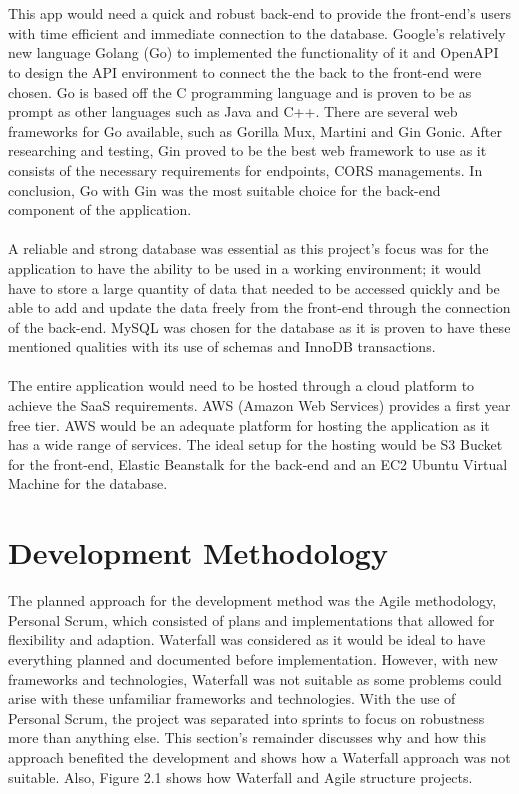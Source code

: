 \\\\ This app would need a quick and robust back-end to provide the front-end's users with time efficient and immediate connection to the database. Google's relatively new language Golang (Go) to implemented the functionality of it and OpenAPI to design the API environment to connect the the back to the front-end were chosen. Go is based off the C programming language and is proven to be as prompt as other languages such as Java and C++. There are several web frameworks for Go available, such as Gorilla Mux, Martini and Gin Gonic. After researching and testing, Gin proved to be the best web framework to use as it consists of the necessary requirements for endpoints, CORS managements. In conclusion, Go with Gin was the most suitable choice for the back-end component of the application.
\\\\ A reliable and strong database was essential as this project's focus was for the application to have the ability to be used in a working environment; it would have to store a large quantity of data that needed to be accessed quickly and be able to add and update the data freely from the front-end through the connection of the back-end. MySQL was chosen for the database as it is proven to have these mentioned qualities with its use of schemas and InnoDB transactions. 
\\\\ The entire application would need to be hosted through a cloud platform to achieve the SaaS requirements. AWS (Amazon Web Services) provides a first year free tier. AWS would be an adequate platform for hosting the application as it has a wide range of services. The ideal setup for the hosting would be S3 Bucket for the front-end, Elastic Beanstalk for the back-end and an EC2 Ubuntu Virtual Machine for the database.

\section{Development Methodology}
The planned approach for the development method was the Agile methodology, Personal Scrum, which consisted of plans and implementations that allowed for flexibility and adaption. Waterfall was considered as it would be ideal to have everything planned and documented before implementation. However, with new frameworks and technologies, Waterfall was not suitable as some problems could arise with these unfamiliar frameworks and technologies. With the use of Personal Scrum, the project was separated into sprints to focus on robustness more than anything else. This section's remainder discusses why and how this approach benefited the development and shows how a Waterfall approach was not suitable. Also, Figure 2.1 shows how Waterfall and Agile structure projects.

